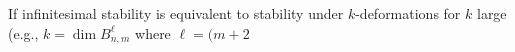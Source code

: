 If infinitesimal stability is equivalent to stability under $k$-deformations for $k$ large (e.g., $k = \dim B_{n,m}^\ell$ where $\ell = (m + 2$
